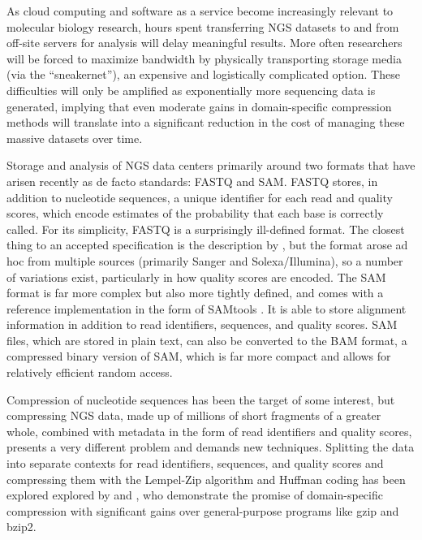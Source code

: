 \documentclass[a4,center,fleqn]{NAR}
\begin{document}
As cloud computing and software as a service become increasingly relevant to
molecular biology research, hours spent transferring NGS datasets to and from
off-site servers for analysis will delay meaningful results. More often
researchers will be forced to maximize bandwidth by physically transporting
storage media (via the ``sneakernet''), an expensive and logistically
complicated option. These difficulties will only be amplified as exponentially
more sequencing data is generated,  implying that even moderate gains in
domain-specific compression methods will translate into a significant
reduction in the cost of managing these massive datasets over time.

\enlargethispage{-65.1pt}

Storage and analysis of NGS data centers primarily around two formats that
have arisen recently as de facto standards: FASTQ and SAM. FASTQ stores, in
addition to nucleotide sequences, a unique identifier for each read and
quality scores, which encode estimates of the probability that each base is
correctly called. For its simplicity, FASTQ is a surprisingly ill-defined
format. The closest thing to an accepted specification is the description by
\citet{Cock2010}, but the format arose ad hoc from multiple sources (primarily
Sanger and Solexa/Illumina), so a number of variations exist, particularly in
how quality scores are encoded. The SAM format is far more complex but also
more tightly defined, and comes with a reference implementation in the form of
SAMtools \citep{Li2009b}. It is able to store alignment information in
addition to read identifiers, sequences, and quality scores. SAM files, which
are stored in plain text, can also be converted to the BAM format, a
compressed binary version of SAM, which is far more compact and allows for
relatively efficient random access.

Compression of nucleotide sequences has been the target of some interest, but
compressing NGS data, made up of millions of short fragments of a greater
whole, combined with metadata in the form of read identifiers and quality
scores, presents a very different problem and demands new techniques.
Splitting the data into separate contexts for read identifiers, sequences, and
quality scores and compressing them with the Lempel-Zip algorithm and Huffman
coding has been explored explored by \citet{Tembe2010} and
\citet{Deorowicz2011}, who demonstrate the promise of domain-specific
compression with significant gains over general-purpose programs like gzip and
bzip2.
\end{document}
